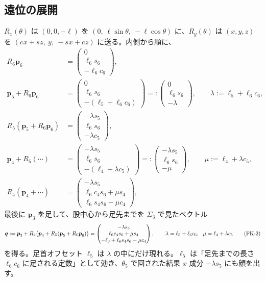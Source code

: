 \documentclass[a4paper,11pt]{ltjsarticle}
\newcommand{\Rx}{R_x}\newcommand{\Ry}{R_y}\newcommand{\Rz}{R_z}
\newcommand{\bp}{\boldsymbol{p}}\newcommand{\bo}{\boldsymbol{o}}\newcommand{\br}{\boldsymbol{r}}
\newcommand{\vc}[3]{\begin{pmatrix}#1\\#2\\#3\end{pmatrix}}
\newcommand{\cs}[1]{c_{#1}}\newcommand{\sn}[1]{s_{#1}}
\begin{document}
\subsection{遠位の展開}
$\Rx(\theta)$ は $(0,0,-\ell)$ を $(0,\ \ell\sin\theta,\ -\ell\cos\theta)$ に、$\Ry(\theta)$ は $(x,y,z)$ を $(\cs{}x+\sn{}z,\ y,\ -\sn{}x+\cs{}z)$ に送る。内側から順に、
\begin{align}
R_6\bp_6&=\vc{0}{\ell_6\sn6}{-\ell_6\cs6},\\
\bp_5+R_6\bp_6&=\vc{0}{\ell_6\sn6}{-(\ell_5+\ell_6\cs6)}=:\vc{0}{\ell_6\sn6}{-\lambda},\qquad \lambda:=\ell_5+\ell_6\cs6,\\
R_5(\bp_5+R_6\bp_6)&=\vc{-\lambda\sn5}{\ell_6\sn6}{-\lambda\cs5},\\
\bp_4+R_5(\cdots)&=\vc{-\lambda\sn5}{\ell_6\sn6}{-(\ell_4+\lambda\cs5)}=:\vc{-\lambda\sn5}{\ell_6\sn6}{-\mu},\qquad \mu:=\ell_4+\lambda\cs5,\\
R_4(\bp_4+\cdots)&=\vc{-\lambda\sn5}{\ell_6\cs4\sn6+\mu\sn4}{\ell_6\sn4\sn6-\mu\cs4},
\end{align}
最後に $\bp_3$ を足して、股中心から足先までを $\Sigma_3$ で見たベクトル
\begin{equation}
\bq:=\bp_3+R_4\bigl(\bp_4+R_5(\bp_5+R_6\bp_6)\bigr)
=\vc{-\lambda\sn5}{\ell_6\cs4\sn6+\mu\sn4}{-\ell_3+\ell_6\sn4\sn6-\mu\cs4},
\qquad \lambda=\ell_5+\ell_6\cs6,\ \ \mu=\ell_4+\lambda\cs5
\tag{FK-2}\label{eq:q}
\end{equation}
を得る。足首オフセット $\ell_5$ は $\lambda$ の中にだけ現れる。$\ell_5$ は「足先までの長さ $\ell_6\cs6$ に足される定数」として効き、$\theta_5$ で回された結果 $x$ 成分 $-\lambda\sn5$ にも顔を出す。
\end{document}
